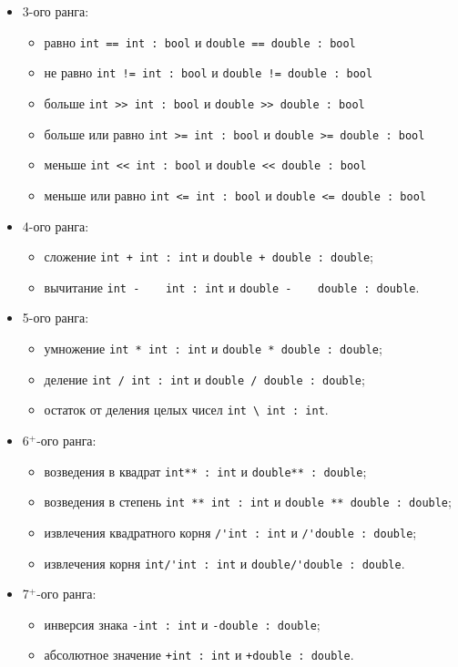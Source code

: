 \documentclass[a4paper, 14pt]{extarticle}
\newenvironment{icItems}
	{ \begin{itemize} [noitemsep,nolistsep] }
	{ \end{itemize} }
\begin{document}
\begin{icItems}
	\item 3-ого ранга:
		\begin{icItems}
			\item равно \lstinline`int == int : bool` и \lstinline`double == double : bool`
			\item не равно \lstinline`int != int : bool` и \lstinline`double != double : bool`
			\item больше \lstinline`int >> int : bool` и \lstinline`double >> double : bool`
			\item больше или равно \lstinline`int >= int : bool` и \lstinline`double >= double : bool`
			\item меньше \lstinline`int << int : bool` и \lstinline`double << double : bool`
			\item меньше или равно \lstinline`int <= int : bool` и \lstinline`double <= double : bool`
		\end{icItems}
	\item 4-ого ранга:
		\begin{icItems}
			\item сложение \lstinline`int + int : int` и \lstinline`double + double : double`;
			\item вычитание \lstinline`int -    int : int` и \lstinline`double -    double : double`.
		\end{icItems}
	\item 5-ого ранга:
		\begin{icItems}
			\item умножение \lstinline`int * int : int` и \lstinline`double * double : double`;
			\item деление \lstinline`int / int : int` и \lstinline`double / double : double`;
			\item остаток от деления целых чисел \lstinline`int \ int : int`.
		\end{icItems}
	\item 6$^+$-ого ранга:
		\begin{icItems}
			\item возведения в квадрат \lstinline`int** : int` и \lstinline`double** : double`;
			\item возведения в степень \lstinline`int ** int : int` и \lstinline`double ** double : double`;
			\item извлечения квадратного корня \lstinline`/'int : int` и \lstinline`/'double : double`;
			\item извлечения корня \lstinline`int/'int : int` и \lstinline`double/'double : double`.
		\end{icItems}
	\item 7$^+$-ого ранга:
		\begin{icItems}
			\item инверсия знака \lstinline`-int : int` и \lstinline`-double : double`;
			\item абсолютное значение \lstinline`+int : int` и \lstinline`+double : double`.
		\end{icItems}
\end{icItems}
\end{document}
